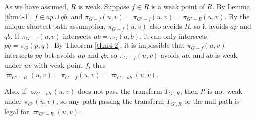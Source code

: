 \documentclass[11pt]{article}
\theoremstyle{plain}
\theoremstyle{definition}
\newcommand{\new}[1]{\pi_{G'}(#1)}
\newcommand{\og}[3]{\pi_{G-#3}\left(#1,#2\right)}
\newcommand{\nng}[3]{\pi_{G'-#3}\left(#1,#2\right)}
\newcommand{\odg}[3]{\varpi_{G-#3}\left(#1,#2\right)}
\newcommand{\ndg}[3]{\varpi_{G'-#3}\left(#1,#2\right)}
\begin{document}
As we have assumed, $R$ is weak. Suppose $f\in R$ is a weak point of $R.$ By Lemma \ref{thm4-1}, $f\in ap\cup qb$, and $\og{u}{v}{f}=\nng{u}{v}{f}=\nng{u}{v}{R}$. By the unique shortest path assumption, $\og{u}{v}{f}$ also avoids $R$, so it avoids $ap$ and $qb$. If $\og{u}{v}{f}$ intersects $ab=\pi_G(a,b)$, it can only intersects $pq=\pi_G(p,q).$ By Theorem \ref{thm4-2}, it is impossible that $\og{u}{v}{f}$ intersects $pq$ but avoids $ap$ and $qb$, so $\og{u}{v}{f}$ avoids $ab$, and $ab$ is weak under $uv$ with weak point $f$, thus $\ndg{u}{v}{R}=\og{u}{v}{f}=\odg{u}{v}{ab}$.

Also, if $\odg{u}{v}{ab}$ does not pass the transform $T_{G',R}$, then $R$ is not weak under $\new{u, v}$, so any path passing the transform $T_{G',R}$ or the null path is legal for $\ndg{u}{v}{R}$.



\iffalse
\begin{itemize}
    \item[*] If $\new{a, b}$ is weak under $\new{u, v}$, then $ab=\pi_G(a,b)$ is weak under $uv=\pi_G(u,v).$
    
\vspace{5pt}
    By Lemma \ref{thm4-1}, $l=\nng{u}{v}{f}=\og{u}{v}{f}.$ If $l$ does not avoids $ab$, it intersects with $pq$ (following $\pi_G(u,v)$), avoids $ap$ and $qb.$ By Theorem \ref{thm4-2}, this is impossible. So $l=\og{u}{v}{f}$ avoids $pq.$ We know by the weakness of $\new{u, v}$, $f$ avoids $ap$ and $qb$, so it avoids $ab.$ It means that $ab$ is weak under $uv$, and $f$ is a weak point.
\vspace{5pt}
    \item[*] $\nng{u}{v}{R}=\og{u}{v}{ab}.$
    
\vspace{5pt}
    On the one side, $\og{u}{v}{ab}$ avoids $R.$ Note that it is a path in $G$, so of course it does not pass $e.$ If it does not avoid $R$, it should intersect with $ua,px,yq,bv$, but avoiding the intervals between them, contradictory.

    On the other side, we prove that $\nng{u}{v}{R}$ avoids $ab.$ If not, then $\nng{u}{v}{R}$ intersects with $ua,pq$ and $bv$, but avoids the intervals between them, contradictory. Note that $pq$ is a shortest path in $G$ but not a shortest path in $G'$, meaning that it should split into several shortest paths in $G'$, and our proof in Theorem \ref{thm4-2} still works.

    Since both sides are the minimum of such possible paths, they should be the same.
\end{itemize}
\fi
\end{document}
